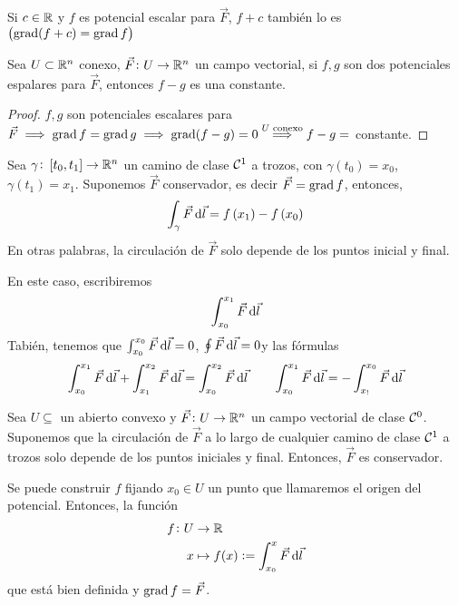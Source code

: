 \begin{obs}
    Si $c \in \mathbb{R}$ y $f$ es potencial escalar para $\vec{F}$, $f+c$ tambi\'en lo es $\left( \operatorname{grad}(f+c)=\operatorname{grad} f \right)$
\end{obs}

\begin{prop*}
    Sea $U \subset \mathbb{R}^n$ conexo, $\vec{F} \colon U \to \mathbb{R}^n$ un campo vectorial, si $f,g$ son dos potenciales espalares para $\vec{F}$, entonces
    $f - g$ es una constante.
\end{prop*}
\begin{proof}
    $f,g$ son potenciales escalares para $\vec{F} \implies \operatorname{grad} f = \operatorname{grad} g \implies \operatorname{grad} (f-g) = 0 \stackrel{U \text{ conexo}}{\implies} f-g =$ constante.
\end{proof}

\begin{obs}
    Sea $\gamma \colon \left[ t_0, t_1 \right] \to \mathbb{R}^n$ un camino de clase $\mathcal{C}^1$ a trozos, con $\gamma\left( t_0 \right) = x_0$, $\gamma\left( t_1 \right)=x_1$.
    Suponemos $\vec{F}$ conservador, es decir $\vec{F} = \operatorname{grad} f$, entonces,
    \[
        \int_\gamma \vec{F} \dif \vec{l} = f\left( x_1 \right) - f\left( x_0 \right)
    \]
    En otras palabras, la circulación de $\vec{F}$ solo depende de los puntos inicial y final.
    
    En este caso, escribiremos
    \[
        \int^{x_1}_{x_0} \vec{F} \dif \vec{l}
    \]
    Tabi\'en, tenemos que $\int^{x_0}_{x_0} \vec{F} \dif \vec{l} = 0$, $\oint \vec{F} \dif \vec{l} = 0$y las fórmulas
    \[
        \int^{x_1}_{x_0} \vec{F} \dif \vec{l} + \int^{x_2}_{x_1} \vec{F} \dif \vec{l} = \int^{x_2}_{x_0} \vec{F} \dif \vec{l}
        \qquad
        \int^{x_1}_{x_0} \vec{F} \dif \vec{l} = - \int^{x_0}_{x_!} \vec{F} \dif \vec{l}
    \]
\end{obs}

\begin{prop}
    Sea $U \subseteq$ un abierto convexo y $\vec{F} \colon U \to \mathbb{R}^n$ un campo vectorial de clase $\mathcal{C}^0$. Suponemos que la circulación de $\vec{F}$
    a lo largo de cualquier camino de clase $\mathcal{C}^1$ a trozos solo depende de los puntos iniciales y final. Entonces, $\vec{F}$ es conservador.
\end{prop}

\begin{obs*}
    Se puede construir $f$ fijando $x_0 \in U$ un punto que llamaremos el origen del potencial. Entonces, la función
    \[
        \begin{aligned}
            f \colon U &\to \real \\ x &\mapsto f(x) := \int^{x}_{x_0} \vec{F} \dif \vec{l}
        \end{aligned}
    \]
    que está bien definida y $\operatorname{grad} f = \vec{F}$.
\end{obs*}

